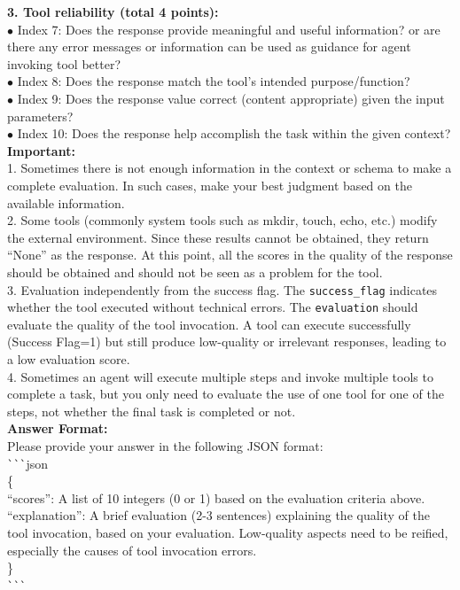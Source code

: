 \documentclass[11pt]{article}
\begin{document}
\begin{tcolorbox}[title={Prompt for agent ${\text{LLM}}_{\text{evaluator}}$},breakable,]
\textbf{3. Tool reliability (total 4 points):}\\
$\bullet$ Index 7: Does the response provide meaningful and useful information? or are there any error messages or information can be used as guidance for agent invoking tool better?\\
$\bullet$ Index 8: Does the response match the tool's intended purpose/function?\\
$\bullet$ Index 9: Does the response value correct (content appropriate) given the input parameters?\\
$\bullet$ Index 10: Does the response help accomplish the task within the given context?\\

\textbf{Important:}\\
1. Sometimes there is not enough information in the context or schema to make a complete evaluation. In such cases, make your best judgment based on the available information.\\
2. Some tools (commonly system tools such as mkdir, touch, echo, etc.) modify the external environment. Since these results cannot be obtained, they return ``None'' as the response. At this point, all the scores in the quality of the response should be obtained and should not be seen as a problem for the tool.\\
3. Evaluation independently from the success flag. The \texttt{success\_flag} indicates whether the tool executed without technical errors. The \texttt{evaluation} should evaluate the quality of the tool invocation. A tool can execute successfully (Success Flag=1) but still produce low-quality or irrelevant responses, leading to a low evaluation score.\\
4. Sometimes an agent will execute multiple steps and invoke multiple tools to complete a task, but you only need to evaluate the use of one tool for one of the steps, not whether the final task is completed or not.\\

\textbf{Answer Format:}\\
Please provide your answer in the following JSON format:\\

\verb|```|json\\
\{\\
\quad ``scores'': A list of 10 integers (0 or 1) based on the evaluation criteria above.\\ 
\quad ``explanation'': A brief evaluation (2-3 sentences) explaining the quality of the tool invocation, based on your evaluation. Low-quality aspects need to be reified, especially the causes of tool invocation errors.\\
\}\\
\verb|```|
\end{tcolorbox}
\end{document}
